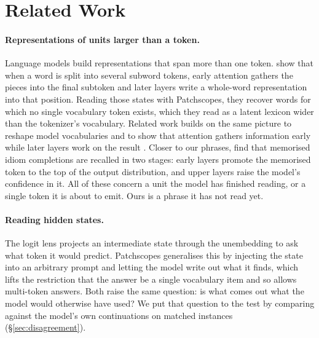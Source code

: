 \section{Related Work}
\label{sec:related}

\paragraph{Representations of units larger than a token.}
Language models build representations that span more than one token.
\citet{kaplan-etal-2025-tokens} show that when a word is split into several
subword tokens, early attention gathers the pieces into the final subtoken and
later layers write a whole-word representation into that position. Reading those
states with Patchscopes, they recover words for which no single vocabulary token
exists, which they read as a latent lexicon wider than the tokenizer's
vocabulary. Related work builds on the same picture to reshape model
vocabularies \citep{reif-etal-2026-vocab} and to show that attention gathers
information early while later layers work on the result
\citep{artzy-schwartz-2024-attend}. Closer to our phrases,
\citet{haviv-etal-2023-understanding} find that memorised idiom completions are
recalled in two stages: early layers promote the memorised token to the top of
the output distribution, and upper layers raise the model's confidence in it.
All of these concern a unit the model has finished reading, or a single token it
is about to emit. Ours is a phrase it has not read yet.

\paragraph{Reading hidden states.}
The logit lens \citep{nostalgebraist-2020-logitlens} projects an intermediate
state through the unembedding to ask what token it would predict. Patchscopes
\citep{ghandeharioun-etal-2024-patchscopes} generalises this by injecting the
state into an arbitrary prompt and letting the model write out what it finds,
which lifts the restriction that the answer be a single vocabulary item and so
allows multi-token answers. Both raise the same question: is what comes out what
the model would otherwise have used? We put that question to the test by
comparing against the model's own continuations on matched instances
(\S\ref{sec:disagreement}).

